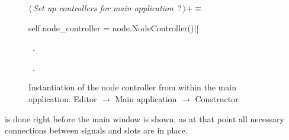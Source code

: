 \documentclass[%
    a4paper,    %
    justified,  %
    nobib,      %
    openany     %
]{tufte-book}
\begin{document}
\begin{figure}
\begin{flushleft} \small
\begin{minipage}{\linewidth}\label{scrap146}\raggedright\small
{} $\langle\,${\itshape Set up controllers for main application}\nobreak\ {\footnotesize {?}}$\,\rangle+\equiv$
\vspace{-1ex}
\begin{pythoncode}
self.node_controller = node.NodeController()|\NWsep|
\end{pythoncode}
\vspace{1.5ex}
\footnotesize
\begin{list}{}{\setlength{\itemsep}{-\parsep}\setlength{\itemindent}{-\leftmargin}}
\item \NWtxtMacroDefBy\ .
\item \NWtxtMacroRefIn\ .

\item{}
\end{list}
\end{minipage}\vspace{4ex}
\end{flushleft}
\caption{Instantiation of the node controller from within the main application.
  \newline{}\newline{}Editor $\rightarrow$ Main application $\rightarrow$
  Constructor}
\label{editor:lst:main-application:constructor:setup-node-controller}
\end{figure}

 is done right before the main window is
shown, as at that point all necessary connections between signals and slots are
in place.
\end{document}
